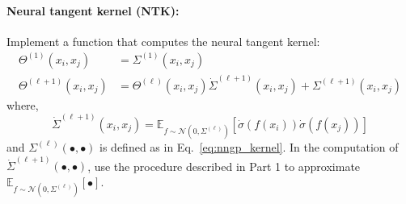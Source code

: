 \documentclass[a4paper,10pt]{article}
\begin{document}
\paragraph{Neural tangent kernel (NTK):}  Implement a function that computes the neural tangent kernel:
\begin{equation}
\begin{aligned}
\Theta^{(1)}\left(x_i, x_j\right) &=\Sigma^{(1)}\left(x_i, x_j\right) \\
\Theta^{(\ell+1)}\left(x_i, x_j\right) &=\Theta^{(\ell)}\left(x_i, x_j\right) \dot{\Sigma}^{(\ell+1)}\left(x_i, x_j\right)+\Sigma^{(\ell+1)}\left(x_i, x_j\right)
\end{aligned}
\end{equation}
where,
\begin{equation}
\dot{\Sigma}^{(\ell+1)}\left(x_i, x_j\right) =\mathbb{E}_{f \sim \mathcal{N}\left(0, \Sigma^{(\ell)}\right)}\left[\dot{\sigma}(f(x_i)) \dot{\sigma}\left(f\left(x_j\right)\right)\right]
\end{equation}
and  $\Sigma^{(\ell)}(\bullet, \bullet)$ is defined as in Eq.~\eqref{eq:nngp_kernel}. In the computation of $\dot{\Sigma}^{(\ell+1)}(\bullet, \bullet)$, use the procedure described in Part 1 to approximate $\mathbb{E}_{f \sim \mathcal{N}\left(0, \Sigma^{(\ell)}\right)}[\bullet]$.
\end{document}
